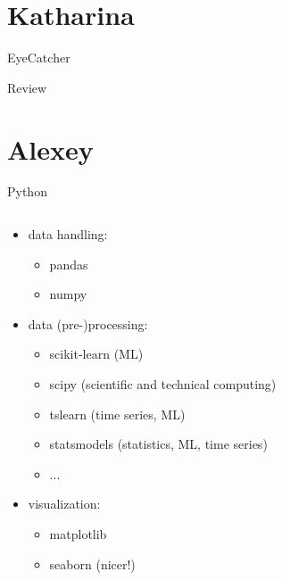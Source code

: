 \documentclass[aspectratio=169,10pt]{beamer}
\begin{document}
\section{Katharina}
\begin{frame}[fragile]{EyeCatcher}
\end{frame}
\begin{frame}[t,fragile]{Review}
\end{frame}


\section{Alexey}

\begin{frame}[fragile]{Python}
    \begin{columns}
        \begin{column}{0.4 \textwidth}
            \begin{itemize}
                \item<2-> data handling:
                \begin{itemize}
                    \item pandas
                    \item numpy
                \end{itemize}
                \item<3-> data (pre-)processing:
                \begin{itemize}
                    \item scikit-learn (ML)
                    \item scipy (scientific and technical computing)
                    \item tslearn (time series, ML)
                    \item statsmodels (statistics, ML, time series)
                    \item ...
                \end{itemize}
                \item<4-> visualization:
                \begin{itemize}
                    \item matplotlib
                    \item seaborn (nicer!)
                \end{itemize}
            \end{itemize}    
        \end{column}
        \begin{column}{0.55 \textwidth}
            

\end{column}
\end{columns}
\end{frame}
\end{document}
